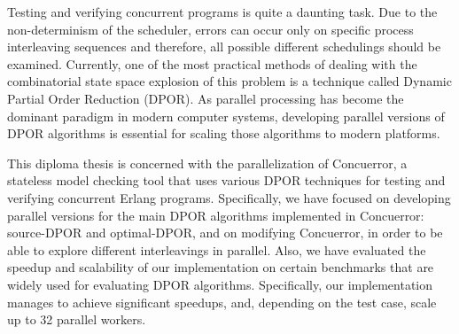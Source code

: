Testing and verifying concurrent programs is quite a daunting task. Due to the non-determinism of the scheduler,
errors can occur only on specific process interleaving sequences and therefore, all possible different
schedulings should be examined. Currently, one of the most practical methods of dealing with the combinatorial state space
explosion of this problem is a technique called Dynamic Partial Order Reduction (DPOR). As parallel processing
has become the dominant paradigm in modern computer systems, developing parallel versions of DPOR algorithms is essential 
for scaling those algorithms to modern platforms.

This diploma thesis is concerned with the parallelization of Concuerror, a stateless model checking tool that uses various
DPOR techniques for testing and verifying concurrent Erlang programs. Specifically, we have focused on developing parallel
versions for the main DPOR algorithms implemented in Concuerror: source-DPOR and optimal-DPOR, and on modifying Concuerror, 
in order to be able to explore different interleavings in parallel.
Also, we have evaluated the speedup and scalability of our implementation on certain benchmarks that
are widely used for evaluating DPOR algorithms. Specifically, our implementation manages to achieve significant speedups, and, depending on the test case, scale up to 32 parallel workers.